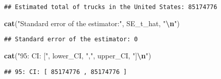 \documentclass[
]{article}
\newenvironment{Shaded}{\begin{snugshade}}{\end{snugshade}}
\newcommand{\FunctionTok}[1]{\textcolor[rgb]{0.13,0.29,0.53}{\textbf{#1}}}
\newcommand{\NormalTok}[1]{#1}
\newcommand{\SpecialCharTok}[1]{\textcolor[rgb]{0.81,0.36,0.00}{\textbf{#1}}}
\newcommand{\StringTok}[1]{\textcolor[rgb]{0.31,0.60,0.02}{#1}}
\begin{document}
\begin{verbatim}
## Estimated total of trucks in the United States: 85174776
\end{verbatim}

\begin{Shaded}
\begin{Highlighting}[]
\FunctionTok{cat}\NormalTok{(}\StringTok{"Standard error of the estimator:"}\NormalTok{, SE\_t\_hat, }\StringTok{"}\SpecialCharTok{\textbackslash{}n}\StringTok{"}\NormalTok{)}
\end{Highlighting}
\end{Shaded}

\begin{verbatim}
## Standard error of the estimator: 0
\end{verbatim}

\begin{Shaded}
\begin{Highlighting}[]
\FunctionTok{cat}\NormalTok{(}\StringTok{"95: CI: ["}\NormalTok{, lower\_CI, }\StringTok{","}\NormalTok{, upper\_CI, }\StringTok{"]}\SpecialCharTok{\textbackslash{}n}\StringTok{"}\NormalTok{)}
\end{Highlighting}
\end{Shaded}

\begin{verbatim}
## 95: CI: [ 85174776 , 85174776 ]
\end{verbatim}

\hfill\break
\end{document}
